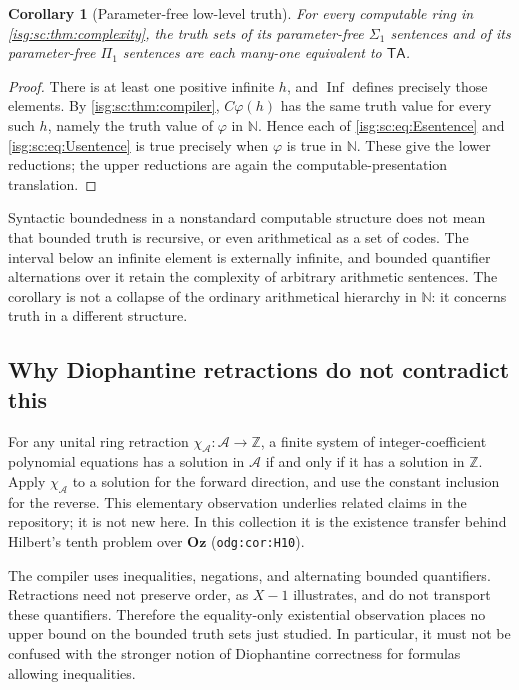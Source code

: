 \documentclass[11pt]{article}
\newtheorem{corollary}[corollary]{Corollary}
\theoremstyle{definition}
\theoremstyle{remark}
\newcommand{\Oz}{\ensuremath{\mathbf{Oz}}}
\newcommand{\Z}{\mathbb{Z}}
\newcommand{\N}{\mathbb{N}}
\newcommand{\TA}{\mathsf{TA}}
\newcommand{\Asc}{\mathcal{A}}
\newcommand{\replabel}[1]{\nolinkurl{#1}}
\begin{document}
\begin{corollary}[Parameter-free low-level truth]\label{isg:sc:cor:sigma}
For every computable ring in \cref{isg:sc:thm:complexity}, the truth sets
of its parameter-free $\Sigma_1$ sentences and of its parameter-free
$\Pi_1$ sentences are each many-one equivalent to $\TA$.
\end{corollary}
\begin{proof}
There is at least one positive infinite $h$, and $\operatorname{Inf}$
defines precisely those elements. By \cref{isg:sc:thm:compiler},
$C\varphi(h)$ has the same truth value for every such $h$, namely the
truth value of $\varphi$ in $\N$. Hence each of
\eqref{isg:sc:eq:Esentence} and \eqref{isg:sc:eq:Usentence} is true
precisely when $\varphi$ is true in $\N$. These give the lower reductions;
the upper reductions are again the computable-presentation translation.
\end{proof}

Syntactic boundedness in a nonstandard computable structure does not mean
that bounded truth is recursive, or even arithmetical as a set of codes.
The interval below an infinite element is externally infinite, and bounded
quantifier alternations over it retain the complexity of arbitrary
arithmetic sentences. The corollary is not a collapse of the ordinary
arithmetical hierarchy in $\N$: it concerns truth in a different
structure.

\subsection{Why Diophantine retractions do not contradict this}\label{isg:sc:sec:diophantine}
For any unital ring retraction $\chi_{\Asc}:\Asc\to\Z$, a finite system of
integer-coefficient polynomial equations has a solution in $\Asc$ if and
only if it has a solution in $\Z$. Apply $\chi_{\Asc}$ to a solution for
the forward direction, and use the constant inclusion for the reverse.
This elementary observation underlies related claims in the repository; it
is not new here. In this collection it is the existence transfer behind
Hilbert's tenth problem over $\Oz$ (\replabel{odg:cor:H10}).

The compiler uses inequalities, negations, and alternating bounded
quantifiers. Retractions need not preserve order, as $X-1$ illustrates,
and do not transport these quantifiers. Therefore the equality-only
existential observation places no upper bound on the bounded truth sets
just studied. In particular, it must not be confused with the stronger
notion of Diophantine correctness for formulas allowing inequalities.
\end{document}
